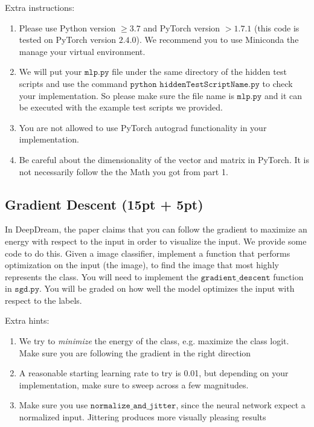 \documentclass{article}
\begin{document}
Extra instructions:
\begin{enumerate}
  \item Please use Python version $\geq 3.7$ and PyTorch version $> 1.7.1$ (this code
        is tested on PyTorch version $2.4.0$). We recommend you to use Miniconda the
        manage your virtual environment.
  \item We will put your $\texttt{mlp.py}$ file under the same directory of the hidden
        test scripts and use the command $\texttt{python hiddenTestScriptName.py}$ to
        check your implementation. So please make sure the file name is
        $\texttt{mlp.py}$ and it can be executed with the example test scripts we
        provided.
  \item You are not allowed to use PyTorch autograd functionality in your
        implementation.
  \item Be careful about the dimensionality of the vector and matrix in PyTorch. It is
        not necessarily follow the the Math you got from part 1.
\end{enumerate}

\subsection{Gradient Descent (15pt + 5pt)}

In DeepDream, the paper claims that you can follow the gradient to maximize an
energy with respect to the input in order to visualize the input. We provide
some code to do this. Given a image classifier, implement a function that
performs optimization on the input (the image), to find the image that most
highly represents the class. You will need to implement the
$\texttt{gradient\_descent}$ function in $\texttt{sgd.py}$. You will be graded
on how well the model optimizes the input with respect to the labels.

Extra hints:
\begin{enumerate}
  \item We try to \emph{minimize} the energy of the class, e.g. maximize the class
        logit. Make sure you are following the gradient in the right direction
  \item A reasonable starting learning rate to try is 0.01, but depending on your
        implementation, make sure to sweep across a few magnitudes.
  \item Make sure you use $\texttt{normalize\_and\_jitter}$, since the neural network
        expect a normalized input. Jittering produces more visually pleasing results
\end{enumerate}
\end{document}
